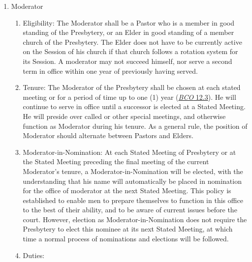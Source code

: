 \documentclass[
]{book}
\providecommand{\tightlist}{%
  \setlength{\itemsep}{0pt}\setlength{\parskip}{0pt}}
\begin{document}
\begin{enumerate}
\def\labelenumi{\Alph{enumi}.}
\item
  Moderator

  \begin{enumerate}
  \def\labelenumii{\arabic{enumii}.}
  \tightlist
  \item
    Eligibility: The Moderator shall be a Pastor who is a member in good standing of the Presbytery, or an Elder in good standing of a member church of the Presbytery. The Elder does not have to be currently active on the Session of his church if that church follows a rotation system for its Session. A moderator may not succeed himself, nor serve a second term in office within one year of previously having served.
  \item
    Tenure: The Moderator of the Presbytery shall be chosen at each stated meeting or for a period of time up to one (1) year (\href{https://bco.evangelpresbytery.com/form-of-government.html\#church-courtsin-general}{\emph{BCO} 12.3}). He will continue to serve in office until a successor is elected at a Stated Meeting. He will preside over called or other special meetings, and otherwise function as Moderator during his tenure. As a general rule, the position of Moderator should alternate between Pastors and Elders.
  \item
    Moderator-in-Nomination: At each Stated Meeting of Presbytery or at the Stated Meeting preceding the final meeting of the current Moderator's tenure, a Moderator-in-Nomination will be elected, with the understanding that his name will automatically be placed in nomination for the office of moderator at the next Stated Meeting. This policy is established to enable men to prepare themselves to function in this office to the best of their ability, and to be aware of current issues before the court. However, election as Moderator-in-Nomination does not require the Presbytery to elect this nominee at its next Stated Meeting, at which time a normal process of nominations and elections will be followed.
  \item
    Duties:


\end{enumerate}
\end{enumerate}
\end{document}
